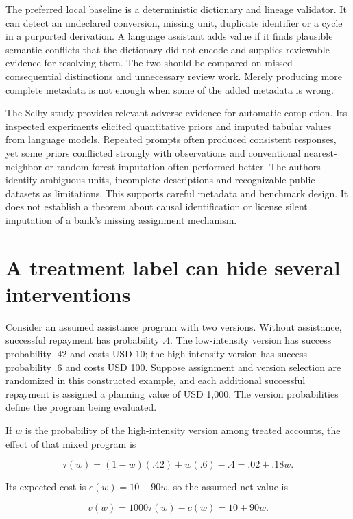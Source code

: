 The preferred local baseline is a deterministic dictionary and lineage
validator. It can detect an undeclared conversion, missing unit,
duplicate identifier or a cycle in a purported derivation. A language
assistant adds value if it finds plausible semantic conflicts that the
dictionary did not encode and supplies reviewable evidence for resolving
them. The two should be compared on missed consequential distinctions
and unnecessary review work. Merely producing more complete metadata is
not enough when some of the added metadata is wrong.

The Selby study provides relevant adverse evidence for automatic
completion. Its inspected experiments elicited quantitative priors and
imputed tabular values from language models. Repeated prompts often
produced consistent responses, yet some priors conflicted strongly with
observations and conventional nearest-neighbor or random-forest
imputation often performed better. The authors identify ambiguous units,
incomplete descriptions and recognizable public datasets as limitations.
This supports careful metadata and benchmark design. It does not
establish a theorem about causal identification or license silent
imputation of a bank's missing assignment mechanism.
\citep{v12_la_2402_07770}

\hypertarget{a-treatment-label-can-hide-several-interventions}{%
\section{A treatment label can hide several
interventions}\label{a-treatment-label-can-hide-several-interventions}}

Consider an assumed assistance program with two versions. Without
assistance, successful repayment has probability .4. The low-intensity
version has success probability .42 and costs USD 10; the high-intensity
version has success probability .6 and costs USD 100. Suppose assignment
and version selection are randomized in this constructed example, and
each additional successful repayment is assigned a planning value of USD
1,000. The version probabilities define the program being evaluated.

If \(w\) is the probability of the high-intensity version among treated
accounts, the effect of that mixed program is

\[
 \tau(w)=(1-w)(.42)+w(.6)-.4=.02+.18w.
\]

Its expected cost is \(c(w)=10+90w\), so the assumed net value is

\[
 v(w)=1000\tau(w)-c(w)=10+90w.
\]

